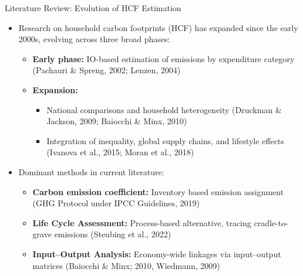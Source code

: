 \documentclass{beamer}
\begin{document}
\begin{frame}{Literature Review: Evolution of HCF Estimation}
\footnotesize
\vspace{-2.5em}
\begin{itemize}
  \item Research on household carbon footprints (HCF) has expanded since the early 2000s, evolving across three broad phases:
  \begin{itemize}
    \footnotesize
    \item \textbf{Early phase:} IO-based estimation of emissions by expenditure category (Pachauri \& Spreng, 2002; Lenzen, 2004)
    \item \textbf{Expansion:} 
    \begin{itemize}
    \item National comparisons and household heterogeneity (Druckman \& Jackson, 2009; Baiocchi \& Minx, 2010)
    \item Integration of inequality, global supply chains, and lifestyle effects (Ivanova et al., 2015; Moran et al., 2018)
    \end{itemize}
  \end{itemize}

  \item Dominant methods in current literature:
 
  \begin{itemize}
    \item  \footnotesize \textbf{Carbon emission coefficient:} Inventory based emission assignment (GHG Protocol under IPCC Guidelines, 2019)
     \item \footnotesize \textbf{Life Cycle Assessment:} Process-based alternative, tracing cradle-to-grave emissions (Steubing et al., 2022)
     \item \footnotesize \textbf{Input–Output Analysis:} Economy-wide linkages via input–output matrices (Baiocchi \& Minx; 2010, Wiedmann, 2009)
  \end{itemize}
\end{itemize}
\end{frame}
\end{document}

